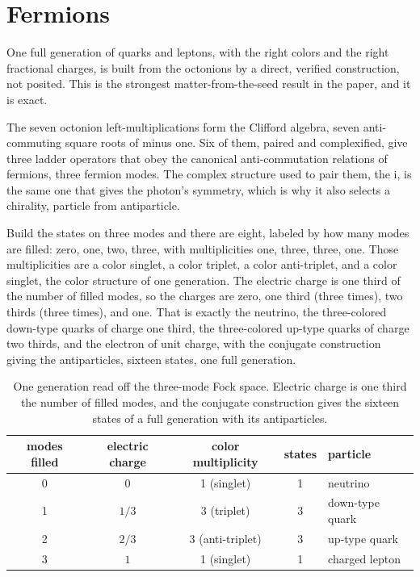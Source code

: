 \section{Fermions}

One full generation of quarks and leptons, with the right colors and the right fractional charges, is built from the
octonions by a direct, verified construction, not posited. This is the strongest matter-from-the-seed result in the
paper, and it is exact.

The seven octonion left-multiplications form the Clifford algebra, seven anti-commuting square roots of minus one. Six of
them, paired and complexified, give three ladder operators that obey the canonical anti-commutation relations of
fermions, three fermion modes. The complex structure used to pair them, the i, is the same one that gives the photon's
symmetry, which is why it also selects a chirality, particle from antiparticle.

Build the states on three modes and there are eight, labeled by how many modes are filled: zero, one, two, three, with
multiplicities one, three, three, one. Those multiplicities are a color singlet, a color triplet, a color anti-triplet,
and a color singlet, the color structure of one generation. The electric charge is one third of the number of filled
modes, so the charges are zero, one third (three times), two thirds (three times), and one. That is exactly the
neutrino, the three-colored down-type quarks of charge one third, the three-colored up-type quarks of charge two thirds,
and the electron of unit charge, with the conjugate construction giving the antiparticles, sixteen states, one full
generation.

\begin{table}[ht]
\centering
\begin{tabular}{@{}ccccl@{}}
\toprule
modes filled & electric charge & color multiplicity & states & particle \\
\midrule
0 & $0$   & 1 (singlet)      & 1 & neutrino \\
1 & $1/3$ & 3 (triplet)      & 3 & down-type quark \\
2 & $2/3$ & 3 (anti-triplet) & 3 & up-type quark \\
3 & $1$   & 1 (singlet)      & 1 & charged lepton \\
\bottomrule
\end{tabular}
\caption{One generation read off the three-mode Fock space. Electric charge is one third the number of filled modes, and the conjugate construction gives the sixteen states of a full generation with its antiparticles.}
\label{tab:generation}
\end{table}

